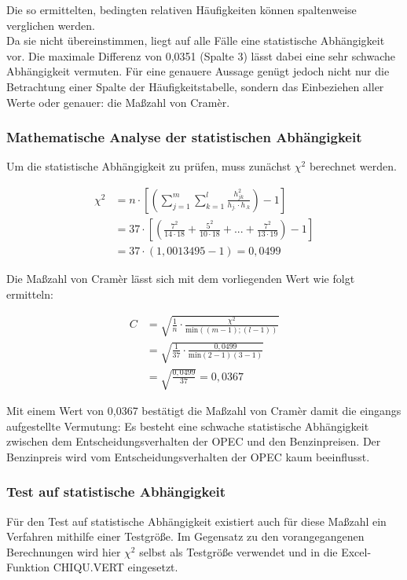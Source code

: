 Die so ermittelten, bedingten relativen Häufigkeiten können spaltenweise verglichen werden.\\
Da sie nicht übereinstimmen, liegt auf alle Fälle eine statistische Abhängigkeit vor. Die maximale Differenz von 0,0351 (Spalte 3) lässt dabei eine sehr schwache Abhängigkeit vermuten. Für eine genauere Aussage genügt jedoch nicht nur die Betrachtung einer Spalte der Häufigkeitstabelle, sondern das Einbeziehen aller Werte oder genauer: die Maßzahl von Cramèr.

\subsubsection{Mathematische Analyse der statistischen Abhängigkeit}
Um die statistische Abhängigkeit zu prüfen, muss zunächst $\chi^2$ berechnet werden.

\begin{align}
  \chi^2 &= n \cdot [(\sum_{j=1}^{m} \sum_{k=1}^{l} \frac{h_{jk}^2}{h_{j.} \cdot h_{.k}})-1]\\
        &= 37 \cdot [(\frac{7^2}{14 \cdot 18} + \frac{5^2}{10 \cdot 18} + ... + \frac{7^2}{13 \cdot 19}) - 1]\\
        &= 37 \cdot (1,0013495 - 1) = 0,0499
\end{align}

Die Maßzahl von Cramèr lässt sich mit dem vorliegenden Wert wie folgt ermitteln:

\begin{align}
  C &= \sqrt{\frac{1}{n} \cdot \frac{\chi^2}{\text{min}((m-1);(l-1))}}\\
    &= \sqrt{\frac{1}{37} \cdot \frac{0,0499}{\text{min}(2-1)(3-1)}}\\
    &= \sqrt{\frac{0,0499}{37}} = 0,0367
\end{align}


Mit einem Wert von 0,0367 bestätigt die Maßzahl von Cramèr damit die eingangs aufgestellte Vermutung: Es besteht eine schwache statistische Abhängigkeit zwischen dem Entscheidungsverhalten der OPEC und den Benzinpreisen. Der Benzinpreis wird vom Entscheidungsverhalten der OPEC kaum beeinflusst.\\


\subsubsection{Test auf statistische Abhängigkeit}
Für den Test auf statistische Abhängigkeit existiert auch für diese Maßzahl ein Verfahren mithilfe einer Testgröße. Im Gegensatz zu den vorangegangenen Berechnungen wird hier $\chi^2$ selbst als Testgröße verwendet und in die Excel-Funktion CHIQU.VERT eingesetzt.

